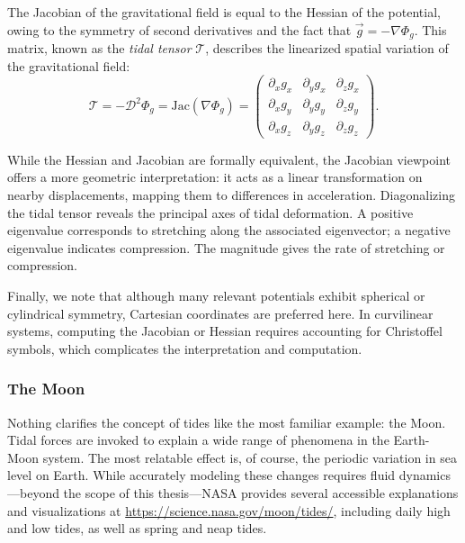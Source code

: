         The Jacobian of the gravitational field is equal to the Hessian of the potential, owing to the symmetry of second derivatives and the fact that \(\vec{g} = -\nabla \Phi_g\). This matrix, known as the \textit{tidal tensor} \(\mathcal{T}\), describes the linearized spatial variation of the gravitational field:
        \begin{equation}
            \mathcal{T} = -\mathcal{D}^2\Phi_g = \mathrm{Jac}(\nabla \Phi_g) = \left(\begin{matrix}
                \partial_x g_x & \partial_y g_x & \partial_z g_x \\
                \partial_x g_y & \partial_y g_y & \partial_z g_y \\
                \partial_x g_z & \partial_y g_z & \partial_z g_z 
            \end{matrix}\right).
        \end{equation}

        While the Hessian and Jacobian are formally equivalent, the Jacobian viewpoint offers a more geometric interpretation: it acts as a linear transformation on nearby displacements, mapping them to differences in acceleration. Diagonalizing the tidal tensor reveals the principal axes of tidal deformation. A positive eigenvalue corresponds to stretching along the associated eigenvector; a negative eigenvalue indicates compression. The magnitude gives the rate of stretching or compression.

        Finally, we note that although many relevant potentials exhibit spherical or cylindrical symmetry, Cartesian coordinates are preferred here. In curvilinear systems, computing the Jacobian or Hessian requires accounting for Christoffel symbols, which complicates the interpretation and computation.


        
        \subsubsection*{The Moon}
            Nothing clarifies the concept of tides like the most familiar example: the Moon. Tidal forces are invoked to explain a wide range of phenomena in the Earth-Moon system. The most relatable effect is, of course, the periodic variation in sea level on Earth. While accurately modeling these changes requires fluid dynamics—beyond the scope of this thesis—NASA provides several accessible explanations and visualizations at \href{https://science.nasa.gov/moon/tides/}{https://science.nasa.gov/moon/tides/}, including daily high and low tides, as well as spring and neap tides.

